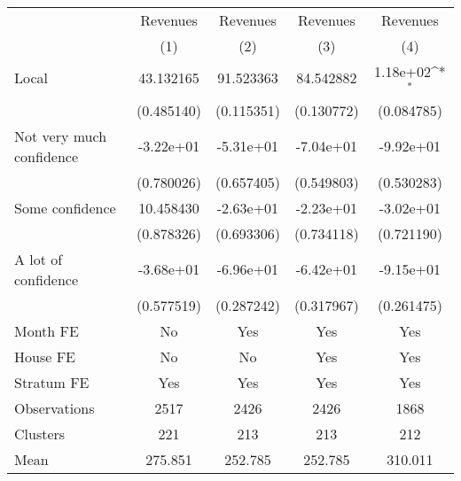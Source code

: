 {
\def\sym#1{\ifmmode^{#1}\else\(^{#1}\)\fi}
\begin{tabular}{l*{4}{c}}
\toprule
                &\multicolumn{1}{c}{Revenues}&\multicolumn{1}{c}{Revenues}&\multicolumn{1}{c}{Revenues}&\multicolumn{1}{c}{Revenues}\\
                &\multicolumn{1}{c}{(1)}         &\multicolumn{1}{c}{(2)}         &\multicolumn{1}{c}{(3)}         &\multicolumn{1}{c}{(4)}         \\
\midrule
Local           &43.132165         &91.523363         &84.542882         & 1.18e+02\sym{*}  \\
                &(0.485140)         &(0.115351)         &(0.130772)         &(0.084785)         \\
Not very much confidence&-3.22e+01         &-5.31e+01         &-7.04e+01         &-9.92e+01         \\
                &(0.780026)         &(0.657405)         &(0.549803)         &(0.530283)         \\
Some confidence &10.458430         &-2.63e+01         &-2.23e+01         &-3.02e+01         \\
                &(0.878326)         &(0.693306)         &(0.734118)         &(0.721190)         \\
A lot of confidence&-3.68e+01         &-6.96e+01         &-6.42e+01         &-9.15e+01         \\
                &(0.577519)         &(0.287242)         &(0.317967)         &(0.261475)         \\
Month FE        &       No         &      Yes         &      Yes         &      Yes         \\
House FE        &       No         &       No         &      Yes         &      Yes         \\
Stratum FE      &      Yes         &      Yes         &      Yes         &      Yes         \\
\midrule
Observations    &     2517         &     2426         &     2426         &     1868         \\
Clusters        &      221         &      213         &      213         &      212         \\
Mean            &  275.851         &  252.785         &  252.785         &  310.011         \\
\bottomrule
\end{tabular}
}
